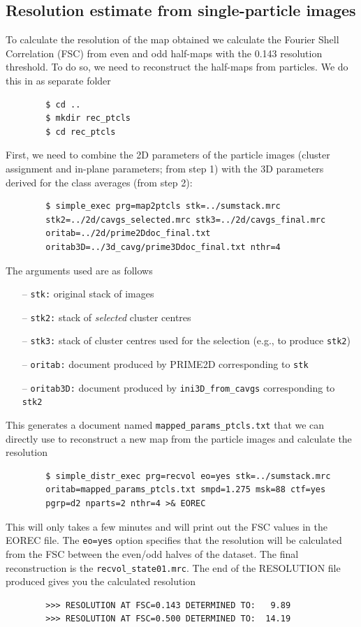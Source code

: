 \documentclass[a4paper,11pt]{article}
\newcommand{\prgname}[1]{\textcolor{NavyBlue}{\texttt{#1}}}
\begin{document}
\subsection{Resolution estimate from single-particle images}
To calculate the resolution of the map obtained we calculate the Fourier Shell Correlation (FSC) from even and odd half-maps with the 0.143 resolution threshold. To do so, we need to reconstruct the half-maps from particles. We do this in as separate folder
\begin{verbatim}
        $ cd ..
        $ mkdir rec_ptcls
        $ cd rec_ptcls
\end{verbatim}
First, we need to combine the 2D parameters of the particle images (cluster assignment and in-plane parameters; from step 1) with the 3D parameters derived for the class averages (from step 2):
\begin{verbatim}
        $ simple_exec prg=map2ptcls stk=../sumstack.mrc
        stk2=../2d/cavgs_selected.mrc stk3=../2d/cavgs_final.mrc
        oritab=../2d/prime2Ddoc_final.txt 
        oritab3D=../3d_cavg/prime3Ddoc_final.txt nthr=4
\end{verbatim}
\noindent{}The arguments used are as follows
\begin{itemize}
\item[--] \texttt{stk:} original stack of images
\item[--] \texttt{stk2:} stack of \textit{selected} cluster centres
\item[--] \texttt{stk3:} stack of cluster centres used for the selection (e.g., to produce \texttt{stk2})
\item[--] \texttt{oritab:} document produced by PRIME2D corresponding to \texttt{stk}
\item[--] \texttt{oritab3D:} document produced by \prgname{ini3D\_from\_cavgs} corresponding to \texttt{stk2}
\end{itemize}
This generates a document named \texttt{mapped\_params\_ptcls.txt} that we can directly use to reconstruct a new map from the particle images and calculate the resolution
\begin{verbatim}
        $ simple_distr_exec prg=recvol eo=yes stk=../sumstack.mrc 
        oritab=mapped_params_ptcls.txt smpd=1.275 msk=88 ctf=yes 
        pgrp=d2 nparts=2 nthr=4 >& EOREC
\end{verbatim}
This will only takes a few minutes and will print out the FSC values in the EOREC file. The \texttt{eo=yes} option specifies that the resolution will be calculated from the FSC between the even/odd halves of the dataset. The final reconstruction is the \texttt{recvol\_state01.mrc}. The end of the RESOLUTION file produced gives you the calculated resolution
\begin{verbatim}
        >>> RESOLUTION AT FSC=0.143 DETERMINED TO:   9.89
        >>> RESOLUTION AT FSC=0.500 DETERMINED TO:  14.19
\end{verbatim}


\end{document}
